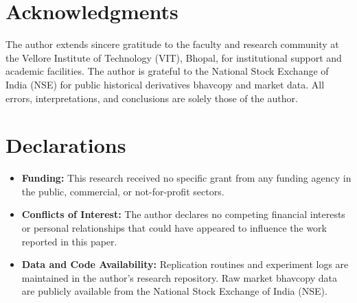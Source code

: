 \documentclass[11pt,a4paper]{article}
\begin{document}
\section*{Acknowledgments}
The author extends sincere gratitude to the faculty and research community at the Vellore Institute of Technology (VIT), Bhopal, for institutional support and academic facilities. The author is grateful to the National Stock Exchange of India (NSE) for public historical derivatives bhavcopy and market data. All errors, interpretations, and conclusions are solely those of the author.

\section*{Declarations}
\begin{itemize}
    \item \textbf{Funding:} This research received no specific grant from any funding agency in the public, commercial, or not-for-profit sectors.
    \item \textbf{Conflicts of Interest:} The author declares no competing financial interests or personal relationships that could have appeared to influence the work reported in this paper.
    \item \textbf{Data and Code Availability:} Replication routines and experiment logs are maintained in the author's research repository. Raw market bhavcopy data are publicly available from the National Stock Exchange of India (NSE).
\end{itemize}



\end{document}
